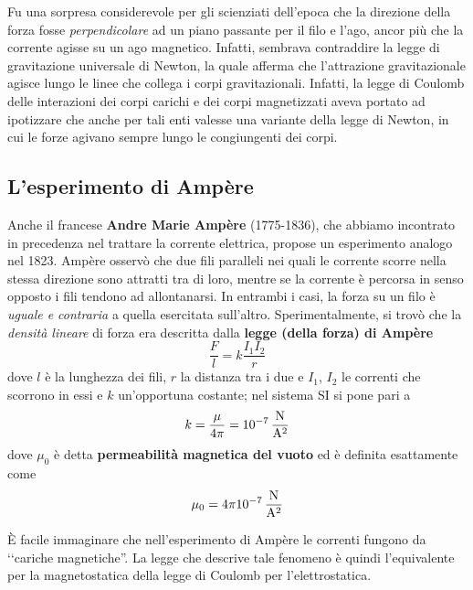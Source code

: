\begin{digression}
	Fu una sorpresa considerevole per gli scienziati dell'epoca che la direzione della forza fosse \textit{perpendicolare} ad un piano passante per il filo e l'ago, ancor più che la corrente agisse su un ago magnetico. Infatti, sembrava contraddire la legge di gravitazione universale di Newton, la quale afferma che l'attrazione gravitazionale agisce lungo le linee che collega i corpi gravitazionali. Infatti, la legge di Coulomb delle interazioni dei corpi carichi e dei corpi magnetizzati aveva portato ad ipotizzare che anche per tali enti valesse una variante della legge di Newton, in cui le forze agivano sempre lungo le congiungenti dei corpi.
\end{digression}
\subsection{L'esperimento di Ampère}\label{EsperimentodiAmpere}
Anche il francese \textbf{Andre Marie Ampère} (1775-1836), che abbiamo incontrato in precedenza nel trattare la corrente elettrica, propose un esperimento analogo nel 1823. %
Ampère osservò che due fili paralleli nei quali le corrente scorre nella stessa direzione sono attratti tra di loro, mentre se la corrente è percorsa in senso opposto i fili tendono ad allontanarsi. In entrambi i casi, la forza su un filo è \textit{uguale e contraria} a quella esercitata sull'altro.
Sperimentalmente, si trovò che la \textit{densità lineare} di forza era descritta dalla \textbf{legge (della forza) di Ampère}
\begin{equation}
	\frac{F}{l}=k\frac{I_1I_2}{r}
\end{equation}
dove $l$ è la lunghezza dei fili, $r$ la distanza tra i due e $I_1$, $I_2$ le correnti che scorrono in essi e $k$ un'opportuna costante; nel sistema SI si pone pari a
\begin{equation}
	k=\frac{\mu}{4\pi}=\SI[per-mode = fraction]{d-7}{\newton\per\ampere\squared}
\end{equation}
dove $\mu_0$ è detta \textbf{permeabilità magnetica del vuoto} ed è definita esattamente come
\begin{equation}
	\mu_0=4\pi\SI[per-mode = fraction]{d-7}{\newton\per\ampere\squared}
\end{equation}

È facile immaginare che nell'esperimento di Ampère le correnti fungono da ‘‘cariche magnetiche''. La legge che descrive tale fenomeno è quindi l'equivalente per la magnetostatica della legge di Coulomb per l'elettrostatica.
